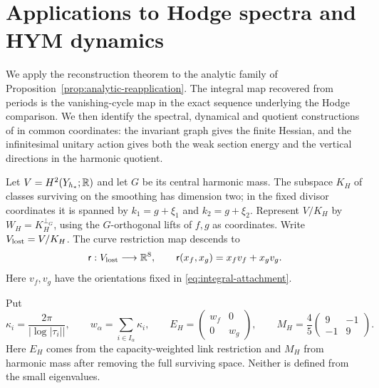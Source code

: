 \section{Applications to Hodge spectra and HYM dynamics}
\label{sec:integrated-theorem}

We apply the reconstruction theorem to the analytic family of
Proposition~\ref{prop:analytic-reapplication}. The integral map
recovered from periods is the vanishing-cycle map in the exact
sequence underlying the Hodge comparison. We then identify the
spectral, dynamical and quotient constructions of \cite{W_HYM}
in common coordinates: the invariant graph gives the finite Hessian,
and the infinitesimal unitary action gives both the weak section
energy and the vertical directions in the harmonic quotient.

Let $V=H^2(Y_{h_*};\mathbb R)$ and let $G$ be its central harmonic
mass. The subspace $K_H$ of classes surviving on the smoothing
has dimension two; in the fixed divisor coordinates it is
spanned by $k_1=g+\xi_1$ and $k_2=g+\xi_2$.
Represent $V/K_H$ by $W_H=K_H^{\perp_G}$, using the
$G$-orthogonal lifts of $f,g$ as coordinates.
Write $V_{\rm lost}=V/K_H$.
The curve restriction map descends to
\begin{equation}\label{eq:lost-restriction}
 \mathsf r:V_{\rm lost}\longrightarrow\mathbb R^8,\qquad
 \mathsf r(x_f,x_g)=x_fv_f+x_gv_g.
\end{equation}
Here $v_f,v_g$ have the orientations fixed in
\eqref{eq:integral-attachment}.

Put
\begin{equation}\label{eq:hodge-model}
 \kappa_i=\frac{2\pi}{|\log|\tau_i||},\qquad
 w_\alpha=\sum_{i\in I_\alpha}\kappa_i,\qquad
 E_H=\begin{pmatrix}w_f&0\\0&w_g\end{pmatrix},\qquad
 M_H=\frac45\begin{pmatrix}9&-1\\-1&9\end{pmatrix}.
\end{equation}
Here $E_H$ comes from the capacity-weighted link restriction
and $M_H$ from harmonic mass after removing the full surviving
space. Neither is defined from the small eigenvalues.

